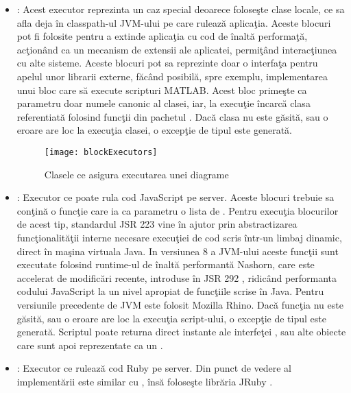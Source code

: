 \begin{itemize}
	\item {}: Acest executor reprezinta un caz special deoarece foloseşte clase locale, ce sa afla deja în classpath-ul JVM-ului pe care rulează aplicaţia. Aceste blocuri pot fi folosite pentru a extinde aplicaţia cu cod de înaltă performaţă, acţionând ca un mecanism de extensii ale aplicatei, permiţând interacţiunea cu alte sisteme. Aceste blocuri pot sa reprezinte doar o interfaţa pentru apelul unor librarii externe, făcând posibilă, spre exemplu, implementarea unui bloc care să execute scripturi MATLAB.
	Acest bloc primeşte ca parametru doar numele canonic al clasei, iar, la execuţie încarcă clasa referentiată folosind funcţii din pachetul . Dacă clasa nu este găsită, sau o eroare are loc la execuţia clasei, o excepţie de tipul  este generată.
	\begin{figure}[H]
		\centering
		\texttt{[image: blockExecutors]}
		\caption{Clasele ce asigura executarea unei diagrame}
		\label{fig:blockExecutors}
	\end{figure}
	\item {}: Executor ce poate rula cod JavaScript pe server. Aceste blocuri trebuie sa conţină o funcţie  care ia ca parametru o lista de . Pentru execuţia blocurilor de acest tip, standardul JSR 223 \autocite{JSR223} vine în ajutor prin abstractizarea funcţionalităţii interne necesare execuţiei de cod scris într-un limbaj dinamic, direct în maşina virtuala Java. In versiunea 8 a JVM-ului aceste funcţii sunt executate folosind runtime-ul de înaltă performantă Nashorn, care este accelerat de modificări recente, introduse în JSR 292  \autocite{JSR292}, ridicând performanta codului JavaScript la un nivel apropiat de funcţiile scrise în Java. Pentru versiunile precedente de JVM este folosit Mozilla Rhino. Dacă funcţia  nu este găsită, sau o eroare are loc la execuţia script-ului, o excepţie de tipul  este generată. Scriptul poate returna direct instante ale interfeţei , sau alte obiecte care sunt apoi reprezentate ca un .
	
	\item {}: Executor ce rulează cod Ruby pe server. Din punct de vedere al implementării este similar cu , însă foloseşte librăria JRuby \autocite{jruby} .
	
\end{itemize}

